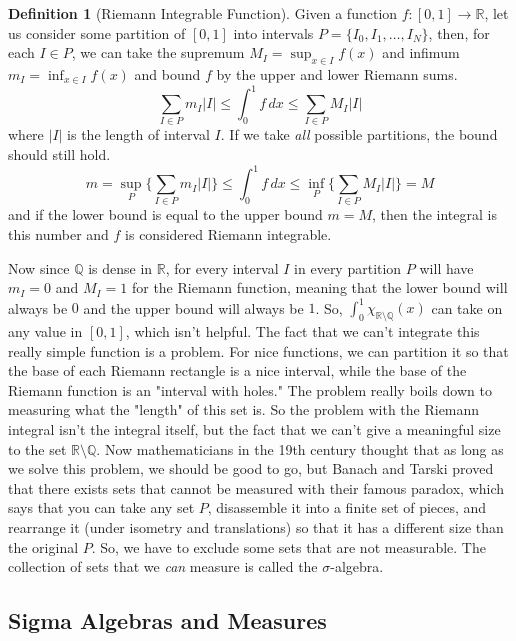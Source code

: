 \documentclass{article}
\theoremstyle{definition}
\theoremstyle{remark}
\theoremstyle{definition}
\newtheorem{definition}{Definition}[section]
\begin{document}
\begin{definition}[Riemann Integrable Function]
Given a function $f: [0, 1] \longrightarrow \mathbb{R}$, let us consider some partition of $[0, 1]$ into intervals $P = \{I_0, I_1, \ldots, I_N\}$, then, for each $I \in P$, we can take the supremum $M_I = \sup_{x \in I} f(x)$ and infimum $m_I = \inf_{x \in I} f(x)$ and bound $f$ by the upper and lower Riemann sums. 
\[\sum_{I \in P} m_I |I| \leq \int_0^1 f \,dx \leq \sum_{I \in P} M_I |I| \]
where $|I|$ is the length of interval $I$. If we take \textit{all} possible partitions, the bound should still hold. 
\[m = \sup_P \Big\{ \sum_{I \in P} m_I |I| \Big\} \leq \int_0^1 f \,dx \leq \inf_P \Big\{ \sum_{I \in P} M_I |I| \Big\} = M\]
and if the lower bound is equal to the upper bound $m = M$, then the integral is this number and $f$ is considered Riemann integrable. 
\end{definition}

Now since $\mathbb{Q}$ is dense in $\mathbb{R}$, for every interval $I$ in every partition $P$ will have $m_I = 0$ and $M_I = 1$ for the Riemann function, meaning that the lower bound will always be $0$ and the upper bound will always be $1$. So, $\int_0^1 \chi_{\mathbb{R} \setminus \mathbb{Q}} (x)$ can take on any value in $[0, 1]$, which isn't helpful. The fact that we can't integrate this really simple function is a problem. For nice functions, we can partition it so that the base of each Riemann rectangle is a nice interval, while the base of the Riemann function is an "interval with holes." The problem really boils down to measuring what the "length" of this set is. So the problem with the Riemann integral isn't the integral itself, but the fact that we can't give a meaningful size to the set $\mathbb{R} \setminus \mathbb{Q}$. Now mathematicians in the 19th century thought that as long as we solve this problem, we should be good to go, but Banach and Tarski proved that there exists sets that cannot be measured with their famous paradox, which says that you can take any set $P$, disassemble it into a finite set of pieces, and rearrange it (under isometry and translations) so that it has a different size than the original $P$. So, we have to exclude some sets that are not measurable. The collection of sets that we \textit{can} measure is called the $\sigma$-algebra. 

\subsection{Sigma Algebras and Measures}
\end{document}
